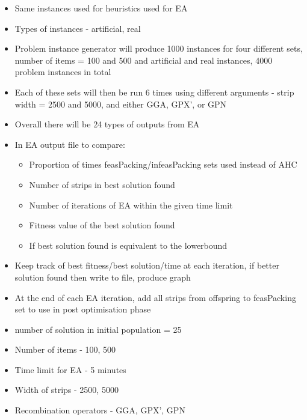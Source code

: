 \documentclass{elsarticle}
\begin{document}
\begin{itemize}
	\item Same instances used for heuristics used for EA
	\item Types of instances - artificial, real
	\item Problem instance generator will produce 1000 instances for four different sets, number of items = 100 and 500 and artificial and real instances, 4000 problem instances in total
	\item Each of these sets will then be run 6 times using different arguments - strip width = 2500 and 5000, and either GGA, GPX', or GPN
	\item Overall there will be 24 types of outputs from EA
	\item In EA output file to compare:
	\begin{itemize}
		\item Proportion of times feasPacking/infeasPacking sets used instead of AHC
		\item Number of strips in best solution found
		\item Number of iterations of EA within the given time limit
		\item Fitness value of the best solution found
		\item If best solution found is equivalent to the lowerbound
	\end{itemize}
	\item Keep track of best fitness/best solution/time at each iteration, if better solution found then write to file, produce graph
	\item At the end of each EA iteration, add all strips from offspring to feasPacking set to use in post optimisation phase
	\item number of solution in initial population = 25
	\item Number of items - 100, 500
	\item Time limit for EA - 5 minutes
	\item Width of strips - 2500, 5000
	\item Recombination operators - GGA, GPX', GPN
\end{itemize}
\end{document}
